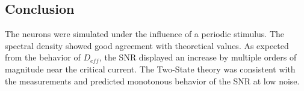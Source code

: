 \documentclass[12pt,a4paper]{article}
\begin{document}
\subsection{Conclusion}
The neurons were simulated under the influence of a periodic stimulus. The spectral density showed good agreement with theoretical values. As expected from the behavior of $D_{eff}$, the SNR displayed an increase by multiple orders of magnitude near the critical current. The Two-State theory was consistent with the measurements and predicted monotonous behavior of the SNR at low noise.
\newpage
\end{document}
